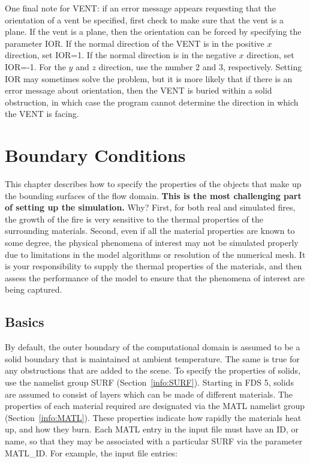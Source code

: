 \documentclass[11pt]{book}
\begin{document}
One final note for {\ct VENT}: if an error message appears requesting that
the orientation of a vent be specified, first check to make sure that the vent is a plane.
If the vent is a plane, then the orientation can be forced by specifying the parameter {\ct IOR}.
If the normal direction of the {\ct VENT} is in the positive $x$ direction, set {\ct IOR=1}.
If the normal direction is in the negative $x$ direction, set {\ct IOR=-1}. For the $y$ and
$z$ direction, use the number 2 and 3, respectively. Setting {\ct IOR} may sometimes solve
the problem, but it is more likely that if there is an error message about orientation, then
the {\ct VENT} is buried within a solid obstruction, in which case the program cannot determine
the direction in which the {\ct VENT} is facing.











\chapter{Boundary Conditions}


This chapter describes how to specify the properties of the objects
that make up the bounding surfaces of the flow domain. {\bf This is
the most challenging part of setting up the simulation.} Why?  First,
for both real and simulated fires, the growth of the fire is very
sensitive to the thermal properties of the surrounding
materials. Second, even if all the material properties are known to
some degree, the physical phenomena of interest may not be simulated
properly due to limitations in the model algorithms or resolution of
the numerical mesh. It is your responsibility to supply the thermal
properties of the materials, and then assess the performance of the
model to ensure that the phenomena of interest are being captured.


\section{Basics}

By default, the outer boundary of the computational domain is assumed
to be a solid boundary that is maintained at ambient temperature. The
same is true for any obstructions that are added to the scene. To
specify the properties of solids, use the namelist group {\ct SURF}
(Section~\ref{info:SURF}). Starting in FDS 5, solids are assumed to
consist of layers which can be made of different materials.  The
properties of each material required are designated via the {\ct MATL}
namelist group (Section~\ref{info:MATL}).  These properties indicate how
rapidly the materials heat up, and how they burn.  Each {\ct MATL}
entry in the input file must have an {\ct ID}, or name, so that they
may be associated with a particular {\ct SURF} via the parameter {\ct
MATL\_ID}.  For example, the input file entries:
\end{document}
